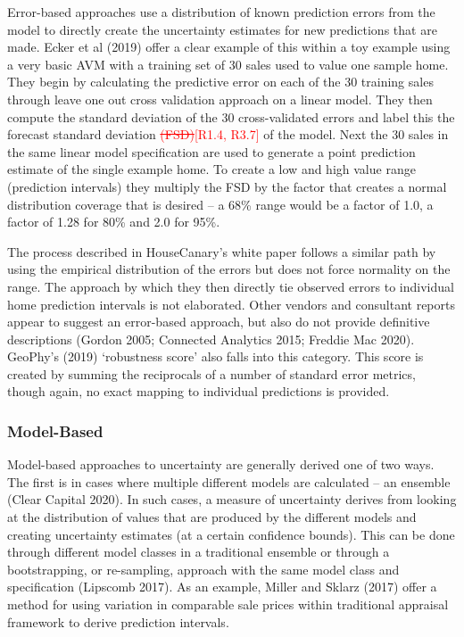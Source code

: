 \documentclass[colTwo]{anon}
\theoremstyle{definition}
\begin{document}
Error-based approaches use a distribution of known prediction errors from the model to directly create the uncertainty estimates for new predictions that are made.  Ecker et al (2019) offer a clear example of this within a toy example using a very basic AVM with a training set of 30 sales used to value one sample home.  They begin by calculating the predictive error on each of the 30 training sales through leave one out cross validation approach on a linear model.  They then compute the standard deviation of the 30 cross-validated errors and label this the forecast standard deviation \textcolor{red}{\st{(FSD)}[R1.4, R3.7]} of the model. Next the 30 sales in the same linear model specification are used to generate a point prediction estimate of the single example home.  To create a low and high value range (prediction intervals) they multiply the FSD by the factor that creates a normal distribution coverage that is desired -- a 68\% range would be a factor of 1.0, a factor of 1.28 for 80\% and 2.0 for 95\%. 

The process described in HouseCanary’s white paper follows a similar path by using the empirical distribution of the errors but does not force normality on the range. The approach by which they then directly tie observed errors to individual home prediction intervals is not elaborated. Other vendors and consultant reports appear to suggest an error-based approach, but also do not provide definitive descriptions (Gordon 2005; Connected Analytics 2015; Freddie Mac 2020). GeoPhy’s (2019) ‘robustness score’ also falls into this category.  This score is created by summing the reciprocals of a number of standard error metrics, though again, no exact mapping to individual predictions is provided.  

\subsubsection{Model-Based}

Model-based approaches to uncertainty are generally derived one of two ways.  The first is in cases where multiple different models are calculated -- an ensemble (Clear Capital 2020).  In such cases, a measure of uncertainty derives from looking at the distribution of values that are produced by the different models and creating uncertainty estimates (at a certain confidence bounds). This can be done through different model classes in a traditional ensemble or through a bootstrapping, or re-sampling, approach with the same model class and specification (Lipscomb 2017).  As an example, Miller and Sklarz (2017) offer a method for using variation in comparable sale prices within traditional appraisal framework to derive prediction intervals.  
\end{document}
